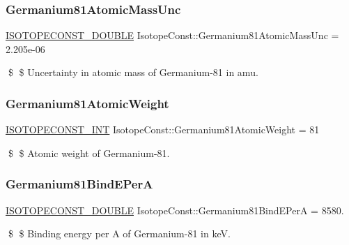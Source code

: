 \subsubsection{\texorpdfstring{Germanium81\+Atomic\+Mass\+Unc}{Germanium81AtomicMassUnc}}
{\footnotesize\ttfamily \mbox{\hyperlink{group___isotope_const-_macros_ga8f45a7272ce02c0b4c65c44636ed719a}{I\+S\+O\+T\+O\+P\+E\+C\+O\+N\+S\+T\+\_\+\+D\+O\+U\+B\+LE}} Isotope\+Const\+::\+Germanium81\+Atomic\+Mass\+Unc = 2.\+205e-\/06}

\$ \$ Uncertainty in atomic mass of Germanium-\/81 in amu. \mbox{\label{group___isotope_const-_germanium-_ge81_gaa0fdd2ab19b82302e35730bf6b1b1edf}} 
\subsubsection{\texorpdfstring{Germanium81\+Atomic\+Weight}{Germanium81AtomicWeight}}
{\footnotesize\ttfamily \mbox{\hyperlink{group___isotope_const-_macros_ga5f18360b3e99483a35c32d789e62621c}{I\+S\+O\+T\+O\+P\+E\+C\+O\+N\+S\+T\+\_\+\+I\+NT}} Isotope\+Const\+::\+Germanium81\+Atomic\+Weight = 81}

\$ \$ Atomic weight of Germanium-\/81. \mbox{\label{group___isotope_const-_germanium-_ge81_ga802d30cb5f9780d4b0b7f6a826d27bed}} 
\subsubsection{\texorpdfstring{Germanium81\+Bind\+E\+PerA}{Germanium81BindEPerA}}
{\footnotesize\ttfamily \mbox{\hyperlink{group___isotope_const-_macros_ga8f45a7272ce02c0b4c65c44636ed719a}{I\+S\+O\+T\+O\+P\+E\+C\+O\+N\+S\+T\+\_\+\+D\+O\+U\+B\+LE}} Isotope\+Const\+::\+Germanium81\+Bind\+E\+PerA = 8580.}

\$ \$ Binding energy per A of Germanium-\/81 in keV. \mbox{\label{group___isotope_const-_germanium-_ge81_ga2b8e6137feb7031acff1de6f609ce072}} 
